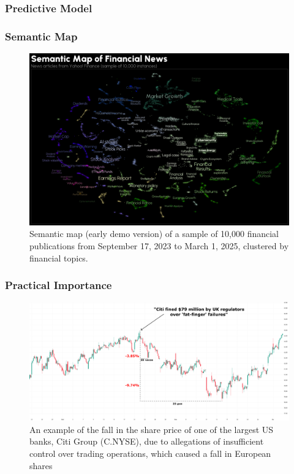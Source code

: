 \subsubsection{Predictive Model}

\subsubsection{Semantic Map}

\begin{figure}[H]
    \centering
    \includegraphics[width=1\linewidth]{img/semantic_map.png}
    \caption{Semantic map (early demo version) of a sample of 10,000 financial publications
    from September 17, 2023 to March 1, 2025, clustered by financial topics.}
    \label{fig:semantic_map}
\end{figure}



\subsubsection{Practical Importance}

\begin{figure}[H]
    \centering
    \includegraphics[width=1\linewidth]{img/citi_group.png}
    \caption{An example of the fall in the share price of one of the largest US banks, Citi Group
    (C.NYSE), due to allegations of insufficient control over trading operations, which caused
    a fall in European shares}
    \label{fig:citi_group}
\end{figure}

